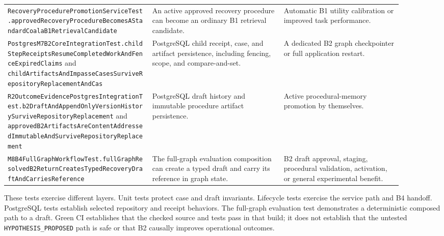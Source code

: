 \begin{longtable}{>{\raggedright\arraybackslash}p{0.33\linewidth} >{\raggedright\arraybackslash}p{0.30\linewidth} >{\raggedright\arraybackslash}p{0.27\linewidth}}
\texttt{Recovery\allowbreak Procedure\allowbreak Promotion\allowbreak Service\allowbreak Test.\allowbreak approved\allowbreak Recovery\allowbreak Procedure\allowbreak Becomes\allowbreak AStandard\allowbreak Coala\allowbreak B1\allowbreak Retrieval\allowbreak Candidate} & An active approved recovery procedure can become an ordinary B1 retrieval candidate. & Automatic B1 utility calibration or improved task performance. \\
\texttt{Postgres\allowbreak M7\allowbreak B2\allowbreak Core\allowbreak Integration\allowbreak Test.\allowbreak child\allowbreak Step\allowbreak Receipts\allowbreak Resume\allowbreak Completed\allowbreak Work\allowbreak And\allowbreak Fence\allowbreak Expired\allowbreak Claims} and \texttt{child\allowbreak Artifacts\allowbreak And\allowbreak Impasse\allowbreak Cases\allowbreak Survive\allowbreak Repository\allowbreak Replacement\allowbreak And\allowbreak Cas} & PostgreSQL child receipt, case, and artifact persistence, including fencing, scope, and compare-and-set. & A dedicated B2 graph checkpointer or full application restart. \\
\texttt{R2\allowbreak Outcome\allowbreak Evidence\allowbreak Postgres\allowbreak Integration\allowbreak Test.\allowbreak b2\allowbreak Draft\allowbreak And\allowbreak Append\allowbreak Only\allowbreak Version\allowbreak History\allowbreak Survive\allowbreak Repository\allowbreak Replacement} and \texttt{approved\allowbreak B2\allowbreak Artifacts\allowbreak Are\allowbreak Content\allowbreak Addressed\allowbreak Immutable\allowbreak And\allowbreak Survive\allowbreak Repository\allowbreak Replacement} & PostgreSQL draft history and immutable procedure artifact persistence. & Active procedural-memory promotion by themselves. \\
\texttt{M8\allowbreak B4\allowbreak Full\allowbreak Graph\allowbreak Workflow\allowbreak Test.\allowbreak full\allowbreak Graph\allowbreak Resolved\allowbreak B2\allowbreak Return\allowbreak Creates\allowbreak Typed\allowbreak Recovery\allowbreak Draft\allowbreak And\allowbreak Carries\allowbreak Reference} & The full-graph evaluation composition can create a typed draft and carry its reference in graph state. & B2 draft approval, staging, procedural validation, activation, or general experimental benefit. \\
\bottomrule
\end{longtable}
\normalsize

These tests exercise different layers. Unit tests protect case and draft invariants. Lifecycle tests exercise the service path and B4 handoff. PostgreSQL tests establish selected repository and receipt behaviors. The full-graph evaluation test demonstrates a deterministic composed path to a draft. Green CI establishes that the checked source and tests pass in that build; it does not establish that the untested \texttt{HYPOTHESIS\_\allowbreak PROPOSED} path is safe or that B2 causally improves operational outcomes.

